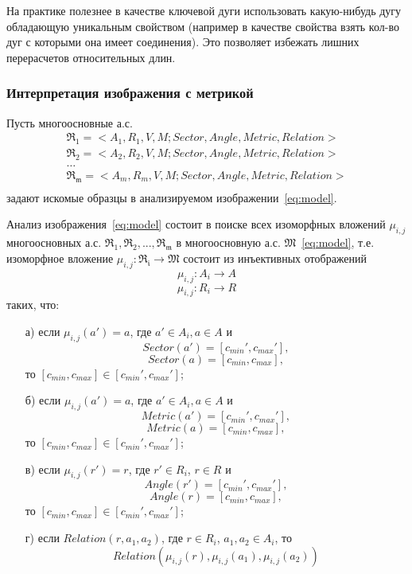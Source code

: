 \begin{remark}
На практике полезнее в качестве ключевой дуги использовать какую-нибудь дугу обладающую уникальным свойством (например в качестве свойства взять кол-во дуг с которыми она имеет соединения). Это позволяет избежать лишних перерасчетов относительных длин. 
\end{remark}

\subsubsection{Интерпретация изображения с метрикой}
\noindent
Пусть многоосновные а.с.
\begin{equation}
	\begin{array}{c}
	\mathfrak{R_1}=<A_1, R_1, V, M; Sector, Angle, Metric, Relation> \\
	\mathfrak{R_2}=<A_2, R_2, V, M; Sector, Angle, Metric, Relation> \\
	\dots\\
	\mathfrak{R_m}=<A_m, R_m, V, M; Sector, Angle, Metric, Relation> \\
	\end{array}
\end{equation}
задают искомые образцы в анализируемом изображении~\ref{eq:model}.

Анализ изображения~\ref{eq:model} состоит в поиске всех изоморфных вложений ${ \mu_{i,j} }$ многоосновных а.с. $\mathfrak{R_1,R_2,...,R_m}$ в многоосновную а.с. $\mathfrak{M}$~\ref{eq:model}, т.е. изоморфное вложение $\mu_{i,j} : \mathfrak{R_i} \rightarrow \mathfrak{M}$ состоит из инъективных отображений
$$\mu_{i,j} : A_i \rightarrow A$$
$$\mu_{i,j} : R_i \rightarrow R$$
таких, что:
\begin{enumerate}
\item[а)] если $\mu_{i,j}(a') = a$, где $a' \in A_i, a \in A$ и 
$$Sector(a') = [c_{min}', c_{max}'],$$
$$Sector(a) = [c_{min}, c_{max}],$$
то $[c_{min}, c_{max}] \in [c_{min}', c_{max}']$;
\item[б)] если $\mu_{i,j}(a') = a$, где $a' \in A_i, a \in A$ и 
$$Metric(a') = [c_{min}', c_{max}'],$$
$$Metric(a) = [c_{min}, c_{max}],$$
то $[c_{min}, c_{max}] \in [c_{min}', c_{max}']$;
\item[в)] если $\mu_{i,j}(r') = r$, где $r' \in R_i$, $r \in R$ и 
$$Angle(r') =  [c_{min}', c_{max}'],$$
$$Angle(r) = [c_{min}, c_{max}],$$
то $[c_{min}, c_{max}] \in [c_{min}', c_{max}']$;
\item[г)] если $Relation(r, a_1, a_2)$, где $r \in R_i$, $a_1, a_2 \in A_i$, то 
$$Relation(\mu_{i,j}(r), \mu_{i,j}(a_1), \mu_{i,j}(a_2))$$
\end{enumerate}

